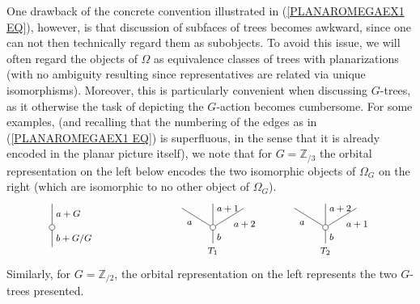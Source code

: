 \documentclass[a4paper,10pt]{article}%
\begin{document}
One drawback of the concrete convention 
illustrated in (\ref{PLANAROMEGAEX1 EQ}), 
however, is that discussion of subfaces of trees becomes awkward, since one can not then technically regard them as subobjects. To avoid this issue, we will often regard the objects of $\Omega$ as equivalence classes of trees with planarizations 
(with no ambiguity resulting since representatives are related via unique isomorphisms).
Moreover, this is particularly convenient when discussing $G$-trees, as it otherwise the task of depicting the $G$-action becomes cumbersome. For some examples, (and recalling that the numbering of the edges as in (\ref{PLANAROMEGAEX1 EQ}) is superfluous, in the sense that it is already encoded in the planar picture itself), we note that for $G=\mathbb{Z}_{/3}$ the orbital representation on the left below encodes the two isomorphic objects of $\Omega_G$ on the right 
(which are isomorphic to no other object of $\Omega_G$).
\[
	\begin{tikzpicture}[grow=up,auto,level distance=2.1em,every node/.style = {font=\footnotesize},dummy/.style={circle,draw,inner sep=0pt,minimum size=1.75mm}]
		\node at (0,0) {}
			child{node [dummy] {}
				child{
				edge from parent node [swap] {$a+G$}}
			edge from parent node [swap] {$b+G/G$}};
		\node at (5,0) {$T_1$}
			child{node [dummy] {}
				child[level distance=1.7em,sibling distance = 2.75em]{
				edge from parent node [swap] {$a+2$}}
				child{
				edge from parent node [swap, near end] {$a+1$}}
				child[level distance=1.7em,sibling distance = 2.75em]{
				edge from parent node {$a$}}
			edge from parent node [swap] {$b$}};
		\node at (8.5,0) {$T_2$}
			child{node [dummy] {}
				child[level distance=1.7em,sibling distance = 2.75em]{
				edge from parent node [swap] {$a+1$}}
				child{
				edge from parent node [swap, near end] {$a+2$}}
				child[level distance=1.7em,sibling distance = 2.75em]{
				edge from parent node {$a$}}
			edge from parent node [swap] {$b$}};
	\end{tikzpicture}
\]
Similarly, for $G=\mathbb{Z}_{/2}$, the orbital representation on the left represents the two $G$-trees presented.
\end{document}
